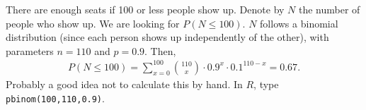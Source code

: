 
\setcounter{theorem}{16}
\begin{exercise}[BH.3.17]
\begin{solution}
	There are enough seats if 100 or less people show up. Denote by $N$ the number of people who show up. We are looking for $P(N\leq 100)$. $N$ follows a binomial distribution (since each person shows up independently of the other), with parameters $n=110$ and $p=0.9$. Then,
	\begin{align*}
		P(N\leq 100) = \sum_{x=0}^{100}{110 \choose x}\cdot 0.9^{x}\cdot 0.1^{110-x} = 0.67.
	\end{align*}
	Probably a good idea not to calculate this by hand. In $R$, type \texttt{pbinom(100,110,0.9)}.
\end{solution}
\end{exercise}


